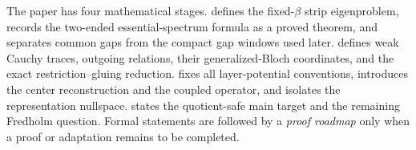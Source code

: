 The paper has four mathematical stages.  
defines the fixed-$\beta$ strip eigenproblem, records the two-ended
essential-spectrum formula as a proved theorem, and separates common
gaps from the compact gap windows used later.  
defines weak Cauchy traces,
outgoing relations, their generalized-Bloch coordinates, and the exact
restriction--gluing reduction.   fixes all
layer-potential conventions, introduces the center reconstruction and the
coupled operator, and isolates the representation nullspace.
 states the quotient-safe main target and the remaining
Fredholm question.  Formal statements are followed by a \emph{proof roadmap}
only when a proof or adaptation remains to be completed.
